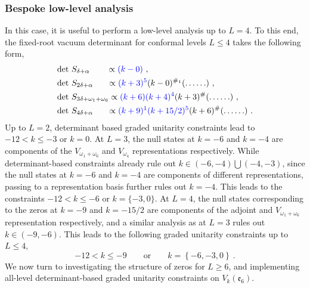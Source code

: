 \subsubsection{Bespoke low-level analysis}
In this case, it is useful to perform a low-level analysis up to $L = 4$. To this end, the fixed-root vacuum determinant for conformal levels $L \leqslant 4$ takes the following form, 
\begin{equation} \label{eq:lowlevele6det1to4}
\begin{split}
    &\text{det}~S_{\delta + \alpha} \qquad \propto \textcolor{blue}{(k - 0)}~, \\
    &\text{det}~S_{2\delta + \alpha} \ \ \ \ \ \propto \textcolor{blue}{(k + 3)^5}(k - 0)^{\#_1} (\ldots \ldots)~, \\ 
    &\text{det}~S_{3\delta + \omega_1 + \omega_6} \propto \textcolor{blue}{(k + 6)(k + 4)^4} (k + 3 )^{\#} (\ldots \ldots)~, \\
    &\text{det}~S_{4\delta + \alpha} \ \ \ \ \ \propto \textcolor{blue}{(k + 9)^{1}(k + 15/2)^5}(k+6)^{\#} (\ldots \ldots)~. \\
\end{split}
\end{equation}
Up to $L  = 2$, determinant based graded unitarity constraints lead to $-12 < k \leqslant -3$ or $k = 0$. At $L = 3$, the null states at $k = -6$ and $k = -4$ are components of the $V_{\omega_1+\omega_6}$ and $V_{\omega_4}$ representations respectively. While determinant-based constraints already rule out $k \in (-6,-4) \bigcup (-4,-3)$, since the null states at $k = -6$ and $k = -4$ are components of different representations, passing to a representation basis further rules out $k = -4$. This leads to the constraints $-12 < k \leqslant -6$ or $k = \{-3,0\}$. At $L = 4$, the null states corresponding to the zeros at $k = -9$ and $k = -15/2$ are components of the adjoint and $V_{\omega_1+\omega_6}$ representation respectively, and a similar analysis as at $L = 3$ rules out $k \in (-9,-6)$. This leads to the following graded unitarity constraints up to $L \leqslant 4$,
\begin{equation} \label{eq:e6lowlevelconst}
    -12<k \leqslant -9 \qquad \text{or} \qquad k = \left\{-6, -3, 0 \right\}~.
\end{equation}
We now turn to investigating the structure of zeros for $L \geqslant 6$, and implementing all-level determinant-based graded unitarity constraints on $V_k(\mathfrak{e}_6)$.
